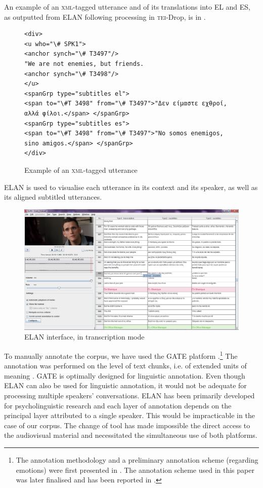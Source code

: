 \documentclass[output=paper]{LSP/langsci}
\begin{document}
An example of an \textsc{xml}-tagged utterance and of its translations into EL and ES, as outputted from ELAN following processing in \textsc{tei}-Drop, is in .

\begin{figure}
\caption{Example of an \textsc{xml}-tagged utterance} \label{fig:2:2}
\begin{lstlisting}
<div>
<u who="\# SPK1">
<anchor synch="\# T3497"/>
"We are not enemies, but friends.
<anchor synch="\# T3498"/>
</u>
<spanGrp type="subtitles el">
<span to="\#T 3498" from="\# T3497">"Δεν είμαστε εχθροί, αλλά φίλοι.</span> </spanGrp>
<spanGrp type="subtitles es">
<span to="\#T 3498" from="\# T3497">"No somos enemigos, sino amigos.</span> </spanGrp>
</div>
\end{lstlisting}
\end{figure}


ELAN is used to visualise each utterance in its context and its speaker, as well as its aligned subtitled utterances.

\begin{figure}
\includegraphics[width=1.0\textwidth]{./figures/4-2.png}
\caption{ELAN interface, in transcription mode}
\end{figure}

To manually annotate the corpus, we have used the GATE platform \citep{Cunningham2002}.\footnote{The annotation methodology and a preliminary annotation scheme (regarding emotions) were first presented in \citet{Mouka2012}. The annotation scheme used in this paper was later finalised and has been reported in \citet{Mouka2014}.} The annotation was performed on the level of text chunks, i.e. of extended units of meaning \citep{Sinclair1996a}. GATE is optimally designed for linguistic annotation. Even though ELAN can also be used for linguistic annotation, it would not be adequate for processing multiple speakers' conversations. ELAN has been primarily developed for psycholinguistic research and each layer of annotation depends on the principal layer attributed to a single speaker. This would be impracticable in the case of our corpus. The change of tool has made impossible the direct access to the audiovisual material and necessitated the simultaneous use of both platforms.
\end{document}
